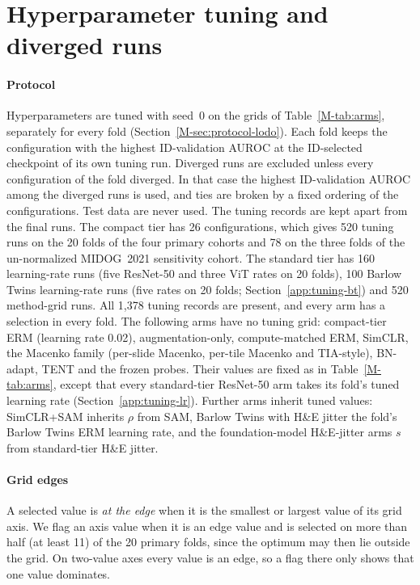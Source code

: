\section{Hyperparameter tuning and diverged runs}
\label{app:tuning}

\paragraph{Protocol} Hyperparameters are tuned with seed~0 on the grids of
Table~\ref{M-tab:arms}, separately for every fold
(Section~\ref{M-sec:protocol-lodo}). Each fold keeps the configuration with the
highest ID-validation AUROC at the ID-selected checkpoint of its own tuning
run. Diverged runs are excluded unless every configuration of the fold
diverged. In that case the highest ID-validation AUROC among the diverged runs
is used, and ties are broken by a fixed ordering of the configurations. Test
data are never used. The tuning records are kept apart from the final runs.
The compact tier has 26 configurations, which gives 520 tuning runs on the 20
folds of the four primary cohorts and 78 on the three folds of the
un-normalized MIDOG~2021 sensitivity cohort. The standard tier has 160
learning-rate runs (five ResNet-50 and three ViT rates on 20 folds), 100
Barlow Twins learning-rate runs (five rates on 20 folds; Section~\ref{app:tuning-bt})
and 520 method-grid runs. All 1,378 tuning records are present, and every
arm has a selection in every fold. The following arms have no tuning grid: compact-tier ERM (learning rate 0.02),
augmentation-only, compute-matched ERM, SimCLR, the Macenko family (per-slide
Macenko, per-tile Macenko and TIA-style), BN-adapt, TENT and the frozen probes.
Their values are fixed as in Table~\ref{M-tab:arms}, except that every
standard-tier ResNet-50 arm takes its fold's tuned learning rate
(Section~\ref{app:tuning-lr}). Further arms inherit tuned values: SimCLR+SAM inherits $\rho$ from SAM, Barlow Twins with H\&E jitter the
fold's Barlow Twins ERM learning rate, and the foundation-model H\&E-jitter arms $s$
from standard-tier H\&E jitter.

\paragraph{Grid edges} A selected value is \emph{at the edge} when it is the
smallest or largest value of its grid axis. We flag an axis value when it is an
edge value and is selected on more than half (at least 11) of the 20 primary
folds, since the optimum may then lie outside the grid. On two-value axes every
value is an edge, so a flag there only shows that one value dominates.

